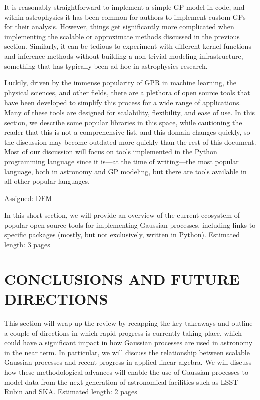 \documentclass[letterpaper]{ar-1col}
\begin{document}
It is reasonably straightforward to implement a simple GP model in code, and within astrophysics it has been common for authors to implement custom GPs for their analysis.
However, things get significantly more complicated when implementing the scalable or approximate methods discussed in the previous section.
Similarly, it can be tedious to experiment with different kernel functions and inference methods without building a non-trivial modeling infrastructure, something that has typically been ad-hoc in astrophysics research.

Luckily, driven by the immense popularity of GPR in machine learning, the physical sciences, and other fields, there are a plethora of open source tools that have been developed to simplify this process for a wide range of applications.
Many of these tools are designed for scalability, flexibility, and ease of use.
In this section, we describe some popular libraries in this space, while cautioning the reader that this is not a comprehensive list, and this domain changes quickly, so the discussion may become outdated more quickly than the rest of this document.
Most of our discussion will focus on tools implemented in the Python programming language since it is---at the time of writing---the most popular language, both in astronomy and GP modeling, but there are tools available in all other popular languages.

Assigned: DFM

In this short section, we will provide an overview of the current ecosystem of popular open source tools for implementing Gaussian processes, including links to specific packages (mostly, but not exclusively, written in Python). Estimated length: 3 pages

\section{CONCLUSIONS AND FUTURE DIRECTIONS}

This section will wrap up the review by recapping the key takeaways and outline a couple of directions in which rapid progress is currently taking place, which could have a significant impact in how Gaussian processes are used in astronomy in the near term. In particular, we will discuss the relationship between scalable Gaussian processes and recent progress in applied linear algebra. We will discuss how these methodological advances will enable the use of Gaussian processes to model data from the next generation of astronomical facilities such as LSST-Rubin and SKA. Estimated length: 2 pages
\end{document}
